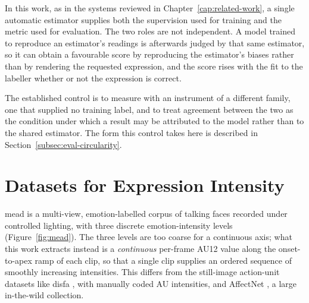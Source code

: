 In this work, as in
the systems reviewed in Chapter~\ref{cap:related-work}, a single automatic estimator supplies both
the supervision used for training and the metric used for evaluation. The two roles are not
independent. A model trained to reproduce an estimator's readings is afterwards judged by that
same estimator, so it can obtain a favourable score by reproducing the estimator's biases rather
than by rendering the requested expression, and the score rises with the fit to the labeller
whether or not the expression is correct.

The established control is to measure with an instrument of a different family, one that supplied
no training label, and to treat agreement between the two as the condition under which a result
may be attributed to the model rather than to the shared estimator. The form this control takes
here is described in Section~\ref{subsec:eval-circularity}.

\section{Datasets for Expression Intensity}\label{sec:bg-datasets}


\gls{mead} \citep{wang2020mead} is a multi-view, emotion-labelled corpus of talking faces recorded
under controlled lighting, with three discrete emotion-intensity levels (Figure~\ref{fig:mead}).
The three levels are too
coarse for a continuous axis; what this work extracts instead is a \emph{continuous} per-frame AU12
value along the onset-to-apex ramp of each clip, so that a single clip supplies an ordered sequence
of smoothly increasing intensities. This differs from the still-image action-unit datasets like \gls{disfa} \citep{mavadati2013disfa}, with manually coded AU intensities, and AffectNet
\citep{mollahosseini2019affectnet}, a large in-the-wild collection.

